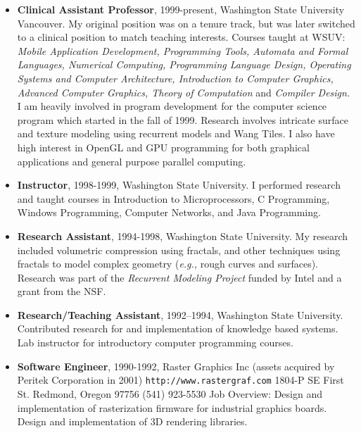 \documentclass[10pt]{article}
\begin{document}
\begin{itemize}

\item {\bf Clinical Assistant Professor}, 1999-present,
Washington State University Vancouver.
My original position was on a tenure track, but was later switched
to a clinical position to match teaching interests.
Courses taught at WSUV:
{\em Mobile Application Development, Programming Tools, 
Automata and Formal Languages, 
Numerical Computing,
Programming Language Design,
Operating Systems and Computer Architecture, 
Introduction to Computer Graphics,
Advanced Computer Graphics, Theory of Computation} and {\em Compiler Design.}
I am heavily involved in program development for 
the computer science program which started in the fall of 1999.
Research involves intricate surface and texture
modeling using recurrent models and Wang Tiles.
I also have high interest in OpenGL and GPU programming for both
graphical applications and general purpose parallel computing.

\item {\bf Instructor}, 1998-1999,
Washington State University. I performed research and taught
courses in Introduction to Microprocessors, C Programming,
Windows Programming, Computer Networks, and Java Programming.

\item {\bf Research Assistant}, 1994-1998,
Washington State University.
My research included volumetric compression using fractals,
and other techniques using fractals to model complex geometry
({\it e.g.,} rough curves and surfaces). Research was part of the
{\em Recurrent Modeling Project} funded by Intel and a grant
from the NSF.

\item {\bf Research/Teaching Assistant}, 1992--1994, 
Washington State University.
Contributed research for and implementation of knowledge based systems.
Lab instructor for
introductory computer programming courses.

\item {\bf Software Engineer}, 1990-1992,
Raster Graphics Inc
(assets acquired by Peritek Corporation in 2001)
{\tt http://www.rastergraf.com}
1804-P SE First St.
Redmond, Oregon 97756
(541) 923-5530
Job Overview: 
Design and implementation of rasterization firmware for
industrial graphics boards. Design and implementation of
3D rendering libraries.
\end{itemize}
\end{document}

